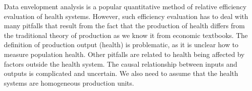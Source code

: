 
\begin{Abstrakt}
    Data envelopment analysis is a popular quantitative method of relative efficiency evaluation of health systems. However, such efficiency evaluation has to deal with many pitfalls that result from the fact that the production of health differs from the traditional theory of production as we know it from economic textbooks. The definition of production output (health) is problematic, as it is unclear how to measure population health. Other pitfalls are related to health being affected by factors outside the health system. The causal relationship between inputs and outputs is complicated and uncertain. We also need to assume that the health systems are homogeneous production units.
\end{Abstrakt}



\clearpage